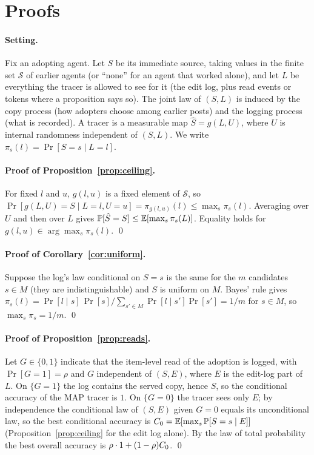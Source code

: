\section{Proofs}\label{app:proofs}

\paragraph{Setting.}
Fix an adopting agent. Let $S$ be its immediate source, taking values in the finite set $\mathcal{S}$ of earlier agents (or ``none'' for an agent that worked alone), and let $L$ be everything the tracer is allowed to see for it (the edit log, plus read events or tokens where a proposition says so). The joint law of $(S,L)$ is induced by the copy process (how adopters choose among earlier posts) and the logging process (what is recorded). A tracer is a measurable map $\hat S=g(L,U)$, where $U$ is internal randomness independent of $(S,L)$. We write $\pi_s(l)=\Pr[S=s\mid L=l]$.

\paragraph{Proof of Proposition~\ref{prop:ceiling}.}
For fixed $l$ and $u$, $g(l,u)$ is a fixed element of $\mathcal{S}$, so $\Pr[g(L,U)=S\mid L=l,U=u]=\pi_{g(l,u)}(l)\le\max_s\pi_s(l)$. Averaging over $U$ and then over $L$ gives $\mathbb{P}[\hat S=S]\le\mathbb{E}[\max_s\pi_s(L)]$. Equality holds for $g(l,u)\in\arg\max_s\pi_s(l)$. \qed

\paragraph{Proof of Corollary~\ref{cor:uniform}.}
Suppose the log's law conditional on $S=s$ is the same for the $m$ candidates $s\in M$ (they are indistinguishable) and $S$ is uniform on $M$. Bayes' rule gives $\pi_s(l)=\Pr[l\mid s]\,\Pr[s]\big/\sum_{s'\in M}\Pr[l\mid s']\Pr[s']=1/m$ for $s\in M$, so $\max_s\pi_s=1/m$. \qed

\paragraph{Proof of Proposition~\ref{prop:reads}.}
Let $G\in\{0,1\}$ indicate that the item-level read of the adoption is logged, with $\Pr[G=1]=\rho$ and $G$ independent of $(S,E)$, where $E$ is the edit-log part of $L$. On $\{G=1\}$ the log contains the served copy, hence $S$, so the conditional accuracy of the MAP tracer is $1$. On $\{G=0\}$ the tracer sees only $E$; by independence the conditional law of $(S,E)$ given $G=0$ equals its unconditional law, so the best conditional accuracy is $C_0=\mathbb{E}[\max_s\mathbb{P}[S=s\mid E]]$ (Proposition~\ref{prop:ceiling} for the edit log alone). By the law of total probability the best overall accuracy is $\rho\cdot1+(1-\rho)C_0$. \qed

